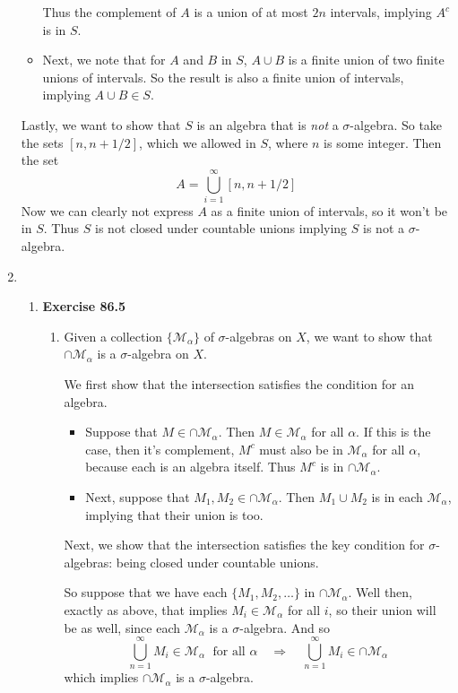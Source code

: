 \documentclass[12pt]{article}
\theoremstyle{plain}
\theoremstyle{definition}
\theoremstyle{remark}
\begin{document}
\begin{enumerate}
\begin{itemize}
Thus the complement of $A$ is a union of at most $2n$ intervals, implying $A^c$ is in $S$.

\item Next, we note that for $A$ and $B$ in $S$, $A\cup B$ is a finite union of two finite unions of intervals. So the result is also a finite union of intervals, implying $A\cup B\in S$.
\end{itemize}

Lastly, we want to show that $S$ is an algebra that is \emph{not} a $\sigma$-algebra. So take the sets $[n,n+1/2]$, which we allowed in $S$, where $n$ is some integer. Then the set
\[
    A = \bigcup_{i=1}^\infty [n,n+1/2]
\]
Now we can clearly not express $A$ as a finite union of intervals, so it won't be in $S$. Thus $S$ is not closed under countable unions implying $S$ is not a $\sigma$-algebra.


\item \begin{enumerate}
\item \textbf{Exercise 86.5}\begin{enumerate}
\item Given a collection $\{\mathscr{M}_\alpha\}$ of $\sigma$-algebras on $X$, we want to show that $\cap \mathscr{M}_\alpha$ is a $\sigma$-algebra on $X$. 
    
We first show that the intersection satisfies the condition for an algebra. 
\begin{itemize}
\item Suppose that $M \in \cap \mathscr{M}_\alpha$. Then $M\in \mathscr{M}_\alpha$ for all $\alpha$. If this is the case, then it's complement, $M^c$ must also be in $\mathscr{M}_\alpha$ for all $\alpha$, because each is an algebra itself. Thus $M^c$ is in $\cap \mathscr{M}_\alpha$. 

\item Next, suppose that $M_1, M_2 \in \cap \mathscr{M}_\alpha$. Then $M_1 \cup M_2$ is in each $\mathscr{M}_\alpha$, implying that their union is too.
\end{itemize}

Next, we show that the intersection satisfies the key condition for $\sigma$-algebras: being closed under countable unions. 

So suppose that we have each $\{M_1, M_2, \ldots\}$ in $\cap \mathscr{M}_\alpha$. Well then, exactly as above, that implies $M_i \in \mathscr{M}_\alpha$ for all $i$, so their union will be as well, since each $\mathscr{M}_\alpha$ is a $\sigma$-algebra. And so 
\[ 
    \bigcup^\infty_{n=1} M_i \in \mathscr{M}_\alpha \;
    \text{ for all $\alpha$} 
    \quad \Rightarrow\quad
    \bigcup^\infty_{n=1} M_i \in \cap\mathscr{M}_\alpha 
\]
which implies $\cap \mathscr{M}_\alpha$ is a $\sigma$-algebra.


\end{enumerate}
\end{enumerate}
\end{enumerate}
\end{document}
